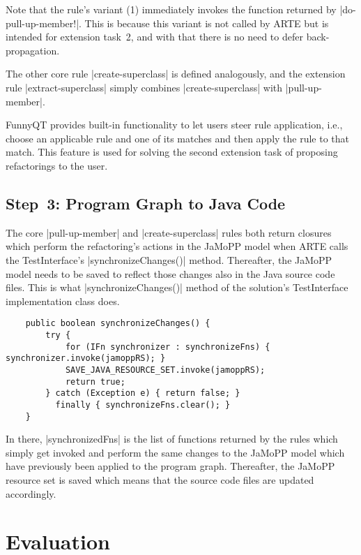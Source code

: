 \documentclass[submission]{eptcs}
\newcommand{\code}{\clojureinline}
\begin{document}
Note that the rule's variant (1) immediately invokes the function returned by
\code|do-pull-up-member!|.  This is because this variant is not called by ARTE
but is intended for extension task~2, and with that there is no need to defer
back-propagation.

The other core rule \code|create-superclass| is defined analogously, and the
extension rule \code|extract-superclass| simply combines
\code|create-superclass| with \code|pull-up-member|.

FunnyQT provides built-in functionality to let users steer rule application,
i.e., choose an applicable rule and one of its matches and then apply the rule
to that match.  This feature is used for solving the second extension task of
proposing refactorings to the user.


\subsection{Step~3: Program Graph to Java Code}
\label{sec:step-3:pg-to-java}

The core \code|pull-up-member| and \code|create-superclass| rules both return
closures which perform the refactoring's actions in the JaMoPP model when ARTE
calls the \textsf{TestInterface}'s \code|synchronizeChanges()| method.
Thereafter, the JaMoPP model needs to be saved to reflect those changes also in
the Java source code files.  This is what \code|synchronizeChanges()| method of
the solution's \textsf{TestInterface} implementation class does.

\begin{verbatim}
    public boolean synchronizeChanges() {
        try {
            for (IFn synchronizer : synchronizeFns) { synchronizer.invoke(jamoppRS); }
            SAVE_JAVA_RESOURCE_SET.invoke(jamoppRS);
            return true;
        } catch (Exception e) { return false; }
          finally { synchronizeFns.clear(); }
    }
\end{verbatim}

In there, \code|synchronizedFns| is the list of functions returned by the rules
which simply get invoked and perform the same changes to the JaMoPP model which
have previously been applied to the program graph.  Thereafter, the JaMoPP
resource set is saved which means that the source code files are updated
accordingly.


\section{Evaluation}
\label{sec:evaluation}
\end{document}
